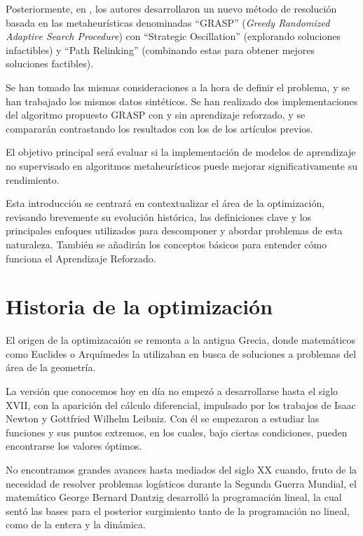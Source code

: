 \documentclass[12pt,a4paper]{book}
\begin{document}
Posteriormente, en \cite{k-Balanced_2}, los autores desarrollaron un nuevo método de resolución basada en las metaheurísticas denominadas ``GRASP''\cite{GRASP} (\textit{Greedy Randomized Adaptive Search Procedure}) con ``Strategic Oscillation''\cite{oscillation} (explorando soluciones infactibles) y ``Path Relinking''\cite{path_relinking} (combinando estas para obtener mejores soluciones factibles).

Se han tomado las mismas consideraciones a la hora de definir el problema, y se han trabajado los mismos datos sintéticos.
Se han realizado dos implementaciones del algoritmo propuesto GRASP con y sin aprendizaje reforzado, y se compararán contrastando los resultados con los de los artículos previos.

El objetivo principal será evaluar si la implementación de modelos de aprendizaje no supervisado en algoritmos metaheurísticos puede mejorar significativamente su rendimiento.

Esta introducción se centrará en contextualizar el área de la optimización, revisando brevemente su evolución histórica, las definiciones clave y los principales enfoques utilizados para descomponer y abordar problemas de esta naturaleza. También se añadirán los conceptos básicos para entender cómo funciona el Aprendizaje Reforzado.


\section{Historia de la optimización}
El origen de la optimizacaión se remonta a la antigua Grecia, donde matemáticos como Euclides o Arquímedes la utilizaban en busca de soluciones a problemas del área de la geometría.

La versión que conocemos hoy en día no empezó a desarrollarse hasta el siglo XVII, con la aparición del cálculo diferencial, impulsado por los trabajos de Isaac Newton y Gottfried Wilhelm Leibniz\cite{Leibniz}. Con él se empezaron a estudiar las funciones y sus puntos extremos,
en los cuales, bajo ciertas condiciones, pueden encontrarse los valores óptimos.

No encontramos grandes avances hasta mediados del siglo XX cuando, fruto de la necesidad de resolver problemas logísticos durante la Segunda Guerra Mundial, el matemático George Bernard Dantzig \cite{Dantzig} desarrolló la programación lineal, la cual sentó las bases para el posterior surgimiento tanto de la programación no lineal, como de la entera y la dinámica.
\end{document}
